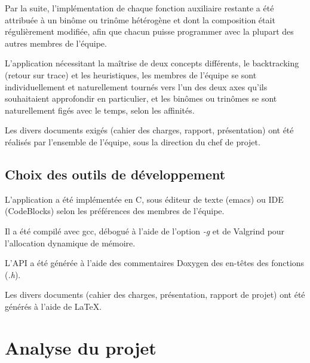 \documentclass[a4paper, 12pt]{article}
\begin{document}
	\par Par la suite, l'implémentation de chaque fonction auxiliaire restante a été attribuée à un binôme ou trinôme hétérogène et dont la composition était régulièrement modifiée, afin que chacun puisse programmer avec la plupart des autres membres de l'équipe.
	\par L'application nécessitant la maîtrise de deux concepts différents, le backtracking (retour sur trace) et les heuristiques, les membres de l'équipe se sont individuellement et naturellement tournés vers l'un des deux axes qu'ils souhaitaient approfondir en particulier, et les binômes ou trinômes se sont naturellement figés avec le temps, selon les affinités.
	\\
	\par Les divers documents exigés (cahier des charges, rapport, présentation) ont été réalisés par l'ensemble de l'équipe, sous la direction du chef de projet.

\subsection{Choix des outils de développement}

	\par L'application a été implémentée en C, sous éditeur de texte (emacs) ou IDE (CodeBlocks) selon les préférences des membres de l'équipe. 
	\par Il a été compilé avec gcc, débogué à l'aide de l'option \emph{-g} et de Valgrind pour l'allocation dynamique de mémoire.
	\par L'API a été générée à l'aide des commentaires Doxygen des en-têtes des fonctions (\emph{.h}).
	\par Les divers documents (cahier des charges, présentation, rapport de projet) ont été générés à l'aide de \LaTeX.

\clearpage

\section{Analyse du projet}
\end{document}
